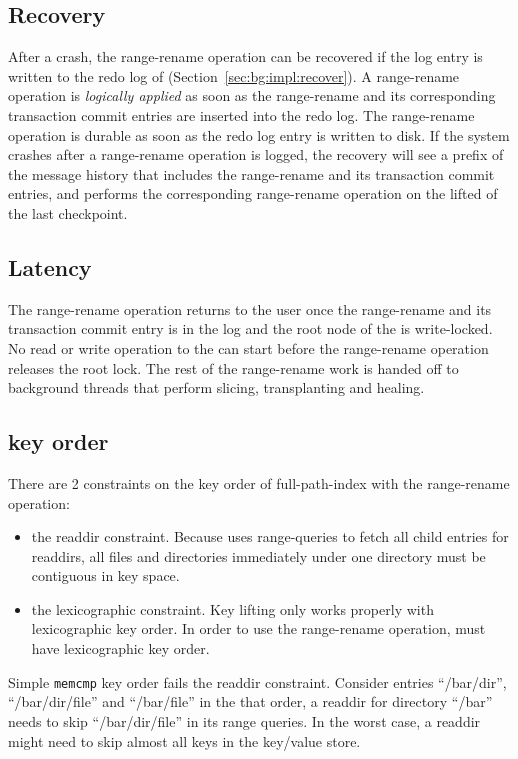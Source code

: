 \subsection{Recovery}

After a crash, the range-rename operation can be recovered if the log entry is
written to the redo log of \fti (Section~\ref{sec:bg:impl:recover}).
A range-rename operation is {\em logically applied} as soon as the
range-rename and its corresponding transaction commit entries are inserted into
the redo log.
The range-rename operation is durable as soon as the redo log entry is written
to disk.
If the system crashes after a range-rename operation is logged, the recovery
will see a prefix of the message history that includes the range-rename
and its transaction commit entries,
and performs the corresponding range-rename operation on the lifted \bets of the
last checkpoint.

\subsection{Latency}

The range-rename operation returns to the user once the range-rename and its
transaction commit entry is in the log and the root node of the \bet is
write-locked.
No read or write operation to the \bet can start before the range-rename
operation releases the root lock.
The rest of the range-rename work is handed off to background threads that
perform slicing, transplanting and healing.

\subsection{\betrfs key order}

There are 2 constraints on the key order of full-path-index \betrfs with the
range-rename operation:

\begin{itemize}
\item the readdir constraint. Because \betrfs uses range-queries to fetch all
child entries for readdirs, all files and directories immediately under one
directory must be contiguous in key space.
\item the lexicographic constraint. Key lifting only works properly with
lexicographic key order. In order to use the range-rename operation,
\betrfs must have lexicographic key order.
\end{itemize}

Simple \texttt{memcmp} key order fails the readdir constraint.
Consider entries ``/bar/dir'', ``/bar/dir/file'' and ``/bar/file'' in the that
order, a readdir for directory ``/bar'' needs to skip ``/bar/dir/file'' in
its range queries.
In the worst case, a readdir might need to skip almost all keys in the key/value
store.

